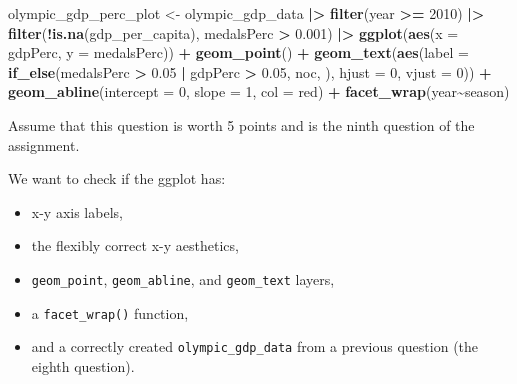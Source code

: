 \documentclass[
  12pt,
]{book}
\newenvironment{Shaded}{\begin{snugshade}}{\end{snugshade}}
\newcommand{\AttributeTok}[1]{\textcolor[rgb]{0.13,0.29,0.53}{#1}}
\newcommand{\DecValTok}[1]{\textcolor[rgb]{0.00,0.00,0.81}{#1}}
\newcommand{\FloatTok}[1]{\textcolor[rgb]{0.00,0.00,0.81}{#1}}
\newcommand{\FunctionTok}[1]{\textcolor[rgb]{0.13,0.29,0.53}{\textbf{#1}}}
\newcommand{\NormalTok}[1]{#1}
\newcommand{\OtherTok}[1]{\textcolor[rgb]{0.56,0.35,0.01}{#1}}
\newcommand{\SpecialCharTok}[1]{\textcolor[rgb]{0.81,0.36,0.00}{\textbf{#1}}}
\newcommand{\StringTok}[1]{\textcolor[rgb]{0.31,0.60,0.02}{#1}}
\providecommand{\tightlist}{%
  \setlength{\itemsep}{0pt}\setlength{\parskip}{0pt}}
\begin{document}
\begin{Shaded}
\begin{Highlighting}[]
\NormalTok{olympic\_gdp\_perc\_plot }\OtherTok{\textless{}{-}}\NormalTok{ olympic\_gdp\_data }\SpecialCharTok{|\textgreater{}} 
    \FunctionTok{filter}\NormalTok{(year }\SpecialCharTok{\textgreater{}=} \DecValTok{2010}\NormalTok{) }\SpecialCharTok{|\textgreater{}} 
    \FunctionTok{filter}\NormalTok{(}\SpecialCharTok{!}\FunctionTok{is.na}\NormalTok{(gdp\_per\_capita), medalsPerc }\SpecialCharTok{\textgreater{}} \FloatTok{0.001}\NormalTok{) }\SpecialCharTok{|\textgreater{}} 
    \FunctionTok{ggplot}\NormalTok{(}\FunctionTok{aes}\NormalTok{(}\AttributeTok{x =}\NormalTok{ gdpPerc, }\AttributeTok{y =}\NormalTok{ medalsPerc)) }\SpecialCharTok{+} 
    \FunctionTok{geom\_point}\NormalTok{() }\SpecialCharTok{+}
    \FunctionTok{geom\_text}\NormalTok{(}\FunctionTok{aes}\NormalTok{(}\AttributeTok{label =} \FunctionTok{if\_else}\NormalTok{(medalsPerc }\SpecialCharTok{\textgreater{}} \FloatTok{0.05} \SpecialCharTok{|}\NormalTok{ gdpPerc }\SpecialCharTok{\textgreater{}} \FloatTok{0.05}\NormalTok{, noc, }\StringTok{\textquotesingle{}\textquotesingle{}}\NormalTok{), }
                  \AttributeTok{hjust =} \DecValTok{0}\NormalTok{, }\AttributeTok{vjust =} \DecValTok{0}\NormalTok{)) }\SpecialCharTok{+}
    \FunctionTok{geom\_abline}\NormalTok{(}\AttributeTok{intercept =} \DecValTok{0}\NormalTok{, }\AttributeTok{slope =} \DecValTok{1}\NormalTok{, }\AttributeTok{col =} \StringTok{\textquotesingle{}red\textquotesingle{}}\NormalTok{) }\SpecialCharTok{+}
    \FunctionTok{facet\_wrap}\NormalTok{(year}\SpecialCharTok{\textasciitilde{}}\NormalTok{season)}
\end{Highlighting}
\end{Shaded}

Assume that this question is worth 5 points and is the ninth question of the assignment.

We want to check if the ggplot has:

\begin{itemize}
\tightlist
\item
  x-y axis labels,
\item
  the flexibly correct x-y aesthetics,
\item
  \texttt{geom\_point}, \texttt{geom\_abline}, and \texttt{geom\_text} layers,
\item
  a \texttt{facet\_wrap()} function,
\item
  and a correctly created \texttt{olympic\_gdp\_data} from a previous question (the eighth question).
\end{itemize}
\end{document}

